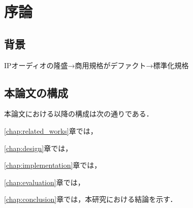\chapter{序論}
\label{chap:introduction}

\section{背景}
\label{section:background}

IPオーディオの隆盛→商用規格がデファクト→標準化規格

\section{本論文の構成}

本論文における以降の構成は次の通りである．

\ref{chap:related_works}章では，

\ref{chap:design}章では，

\ref{chap:implementation}章では，

\ref{chap:evaluation}章では，

\ref{chap:conclusion}章では，本研究における結論を示す．
